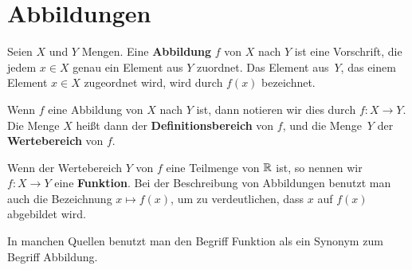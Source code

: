 \section{Abbildungen}


\begin{defn}
Seien $ X $ und $ Y $ Mengen. Eine \textbf{Abbildung} $ f $ von $ X $ nach $ Y $ ist eine Vorschrift, die jedem $ x \in X $ genau ein Element aus $ Y $ zuordnet. Das Element aus~$ Y $, das einem Element $x \in X $ zugeordnet wird, wird durch $ f(x) $ bezeichnet.

Wenn $ f $ eine Abbildung von $ X $ nach $ Y $ ist, dann notieren wir dies durch $ f : X \to Y $. Die Menge $ X $ heißt dann der \textbf{Definitionsbereich} von $ f $, und die Menge~$ Y $ der \textbf{Wertebereich} von $ f $.

Wenn der Wertebereich $Y$ von $f$ eine Teilmenge von $\mathbb{R}$ ist, so nennen wir $f : X \to Y$ eine \textbf{Funktion}. Bei der Beschreibung von Abbildungen benutzt man auch die Bezeichnung $x \mapsto f(x)$, um zu verdeutlichen, dass $x$ auf $f(x)$ abgebildet wird. 
\end{defn} 

\begin{bem} 
In manchen Quellen benutzt man den Begriff Funktion als ein Synonym zum Begriff Abbildung. 
\end{bem} 

%

